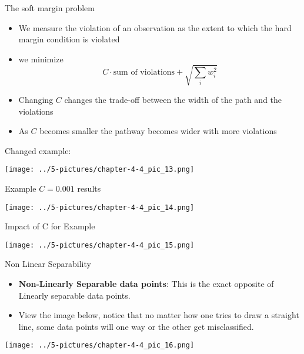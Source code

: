 \documentclass[11pt]{beamer}
\begin{document}
\begin{frame}{The soft margin problem}
	\begin{itemize}
		\item We measure the violation of an observation as the extent to which the hard margin condition is violated
		\item we minimize $$C \cdot \text{sum of violations} + \sqrt{\sum_i w_i^2}$$
		\item Changing $C$  changes the trade-off between the width of the path and the violations
		\item As $C$ becomes smaller the pathway becomes wider with more violations
	\end{itemize}
\end{frame}
\begin{frame}{Changed example: }
	\begin{center}
	\texttt{[image: ../5-pictures/chapter-4-4\_pic\_13.png]}
	\end{center}
\end{frame}
\begin{frame}{Example}
	$C=0.001$ results
	\begin{center}
	\texttt{[image: ../5-pictures/chapter-4-4\_pic\_14.png]}
	\end{center}
\end{frame}
\begin{frame}{Impact of C for Example}
	\begin{center}
	\texttt{[image: ../5-pictures/chapter-4-4\_pic\_15.png]}
	\end{center}
\end{frame}
\begin{frame}{Non Linear Separability}
	\begin{itemize}
		\item \textbf{Non-Linearly Separable data points}: This is the exact opposite of Linearly separable data points. 
		\item View the image below, notice that no matter how one tries to draw a straight line, some data points will one way or the other get misclassified. 
	\end{itemize}
	\begin{center}
	\texttt{[image: ../5-pictures/chapter-4-4\_pic\_16.png]}
	\end{center}
\end{frame}
\end{document}
